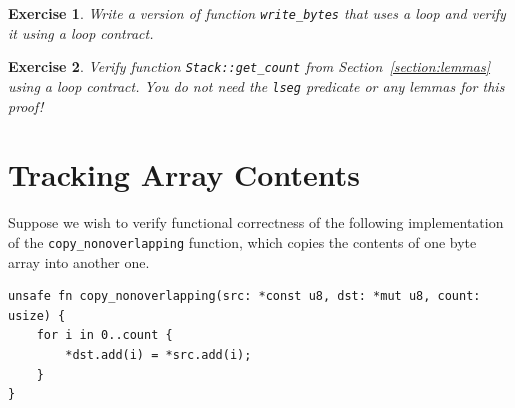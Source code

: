\documentclass{article}
\newtheorem{exercise}{Exercise}
\begin{document}
\begin{exercise}\label{exercise:tuerk}
Write a version of function \lstinline!write_bytes! that uses a loop and verify it using a loop contract.
\end{exercise}

\begin{exercise}\label{exercise:stack_tuerk}
Verify function \lstinline!Stack::get_count! from Section~\ref{section:lemmas} using a loop contract. You do not need
the \lstinline!lseg! predicate or any lemmas for this proof!
\end{exercise}

\section{Tracking Array Contents}\label{section:memcpy}

Suppose we wish to verify functional correctness of the
following implementation of the \lstinline|copy_nonoverlapping| function,
which copies the contents of one byte array into another
one.

\begin{lstlisting}
unsafe fn copy_nonoverlapping(src: *const u8, dst: *mut u8, count: usize) {
    for i in 0..count {
        *dst.add(i) = *src.add(i);
    }
}
\end{lstlisting}
\end{document}
